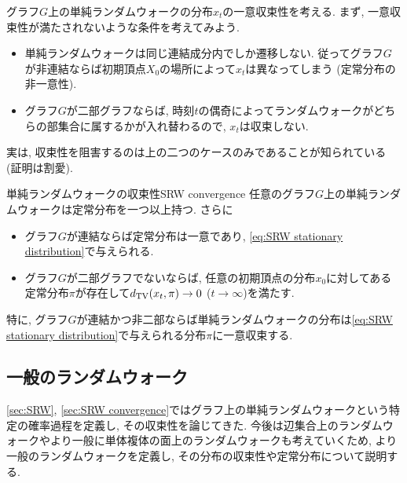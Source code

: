 グラフ$G$上の単純ランダムウォークの分布$x_t$の一意収束性を考える.
まず, 一意収束性が満たされないような条件を考えてみよう.
\begin{itemize}
  \item 単純ランダムウォークは同じ連結成分内でしか遷移しない. 従ってグラフ$G$が非連結ならば初期頂点$X_0$の場所によって$x_t$は異なってしまう (定常分布の非一意性).
  \item グラフ$G$が二部グラフならば, 時刻$t$の偶奇によってランダムウォークがどちらの部集合に属するかが入れ替わるので, $x_t$は収束しない.
\end{itemize}
%
実は, 収束性を阻害するのは上の二つのケースのみであることが知られている (証明は割愛).
%
\begin{theorem}{単純ランダムウォークの収束性}{SRW convergence}
  任意のグラフ$G$上の単純ランダムウォークは定常分布を一つ以上持つ.
  さらに
  \begin{itemize}
    \item グラフ$G$が連結ならば定常分布は一意であり, \cref{eq:SRW stationary distribution}で与えられる.
    \item グラフ$G$が二部グラフでないならば, 任意の初期頂点の分布$x_0$に対してある定常分布$\pi$が存在して$d_{\mathrm{TV}}(x_t,\pi)\to 0$ ($t\to\infty$)を満たす.
  \end{itemize}

  特に, グラフ$G$が連結かつ非二部ならば単純ランダムウォークの分布は\cref{eq:SRW stationary distribution}で与えられる分布$\pi$に一意収束する.
\end{theorem}


\subsection{一般のランダムウォーク} \label{sec:Markov chain}
  \cref{sec:SRW}, \ref{sec:SRW convergence}ではグラフ上の単純ランダムウォークという特定の確率過程を定義し, その収束性を論じてきた.
  今後は辺集合上のランダムウォークやより一般に単体複体の面上のランダムウォークも考えていくため,
  より一般のランダムウォークを定義し, その分布の収束性や定常分布について説明する.

